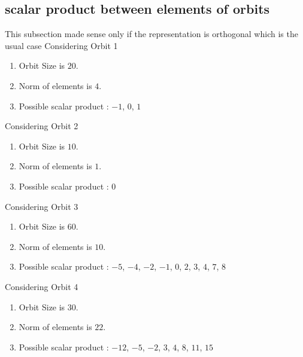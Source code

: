 \documentclass[12pt]{article}
\begin{document}
\subsection{scalar product between elements of orbits}
\noindent This subsection made sense only if the representation is orthogonal which is the usual case
Considering Orbit 1
\begin{enumerate}
\item Orbit Size is $20$.
\item Norm of elements is $4$.
\item Possible scalar product : $-1$, $0$, $1$
\end{enumerate}
Considering Orbit 2
\begin{enumerate}
\item Orbit Size is $10$.
\item Norm of elements is $1$.
\item Possible scalar product : $0$
\end{enumerate}
Considering Orbit 3
\begin{enumerate}
\item Orbit Size is $60$.
\item Norm of elements is $10$.
\item Possible scalar product : $-5$, $-4$, $-2$, $-1$, $0$, $2$, $3$, $4$, $7$, $8$
\end{enumerate}
Considering Orbit 4
\begin{enumerate}
\item Orbit Size is $30$.
\item Norm of elements is $22$.
\item Possible scalar product : $-12$, $-5$, $-2$, $3$, $4$, $8$, $11$, $15$
\end{enumerate}
\end{document}
